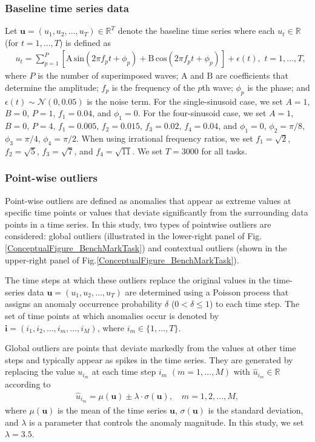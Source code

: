 \documentclass[pdflatex,sn-nature]{sn-jnl}
\theoremstyle{thmstyleone}%
\theoremstyle{thmstyletwo}%
\theoremstyle{thmstylethree}%
\begin{document}
\subsubsection*{Baseline time series data}
Let \(\mathbf{u} = (u_{1},u_{2},\dots,u_{T}) \in \mathbb{R}^{T}\) denote the baseline time series where each \(u_t \in \mathbb{R}\) (for \(t = 1, \dots, T\)) is defined as
\begin{align}    
    &u_t = \sum_{p=1}^{P}[\mathrm{A\,sin}(2\pi f_{p}t+\phi_p)+\mathrm{B\,cos}(2\pi f_{p}t+\phi_p)] + \epsilon(t),\,\, t=1,\dots,T,
\end{align}
where \(P\) is the number of superimposed waves; \(\mathrm{A}\) and \(\mathrm{B}\) are coefficients that determine the amplitude; \(f_p\) is the frequency of the $p$th wave; $\phi_p$ is the phase; and \(\epsilon(t)\sim\mathcal{N}(0, 0.05)\) is the noise term.
For the single-sinusoid case, we set \(A=1\), \(B=0\), \(P=1\), \(f_{1}=0.04\), and \(\phi_{1}=0\). 
For the four-sinusoid case, we set \(A=1\), \(B=0\), \(P=4\), \(f_{1}=0.005\), \(f_{2}=0.015\), \(f_{3}=0.02\), \(f_{4}=0.04\), and \(\phi_{1}=0\), \(\phi_{2}=\pi/8\), \(\phi_{3}=\pi/4\), \(\phi_{4}=\pi/2\). 
When using irrational frequency ratios, we set \(f_{1}=\sqrt{2}\), \(f_{2}=\sqrt{5}\), \(f_{3}=\sqrt{7}\), and \(f_{4}=\sqrt{11}\). 
We set \(T=3000\) for all tasks.

\subsubsection*{Point-wise outliers}
Point-wise outliers are defined as anomalies that appear as extreme values at specific time points or values that deviate significantly from the surrounding data points in a time series. 
In this study, two types of pointwise outliers are considered: global outliers (illustrated in the lower-right panel of Fig.\ref{ConceptualFigure_BenchMarkTask}) and contextual outliers (shown in the upper-right panel of Fig.\ref{ConceptualFigure_BenchMarkTask}).

The time steps at which these outliers replace the original values in the time-series data \(\mathbf{u}=(u_{1},u_{2},\ldots,u_{T})\) are determined using a Poisson process that assigns an anomaly occurrence probability \(\delta\) ($0<\delta \le 1$) to each time step. 
The set of time points at which anomalies occur is denoted by \(\mathbf{i} = (i_1,i_2,\dots,i_m,\dots,i_M)\), where \(i_m \in \{1,\dots,T\}\).

Global outliers are points that deviate markedly from the values at other time steps and typically appear as spikes in the time series.
They are generated by replacing the value \(u_{i_m}\) at each time step \(i_m\) \((m=1,\dots,M)\) with \(\hat{u}_{i_m} \in \mathbb{R}\) according to
\begin{align}
    \hat{u}_{i_m} = \mu(\mathbf{u}) \pm \lambda \cdot \sigma(\mathbf{u}), \quad m=1,2,\dots,M,
\end{align}
where \(\mu(\mathbf{u})\) is the mean of the time series \(\mathbf{u}\), \(\sigma(\mathbf{u})\) is the standard deviation, and \(\lambda\) is a parameter that controls the anomaly magnitude. 
In this study, we set \(\lambda =3.5\).
\end{document}
